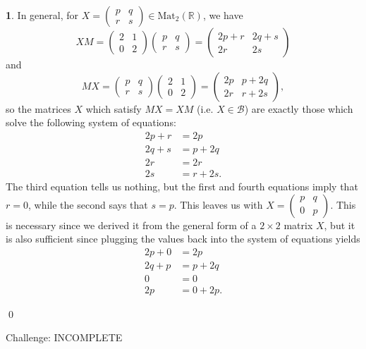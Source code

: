 \documentclass[12pt]{article}
\theoremstyle{definition}
\newtheorem{ex}{}
\begin{document}
\begin{ex}
	In general, for $X = \begin{pmatrix}p & q \\ r & s\end{pmatrix} \in \mathrm{Mat}_2(\mathbb{R})$, we have \begin{equation*}
		XM = \begin{pmatrix}
			2 & 1 \\ 0 & 2
		\end{pmatrix}\begin{pmatrix}
			p & q \\ r & s
		\end{pmatrix} = \begin{pmatrix}
			2p + r & 2q + s \\ 2r & 2s
		\end{pmatrix}
	\end{equation*}
	and \begin{equation*}
		MX = \begin{pmatrix}
			p & q \\ r & s
		\end{pmatrix}\begin{pmatrix}
			2 & 1 \\ 0 & 2
		\end{pmatrix} = \begin{pmatrix}
			2p & p + 2q \\ 2r & r + 2s
		\end{pmatrix},
	\end{equation*}
	so the matrices $X$ which satisfy $MX = XM$ (i.e. $X \in \mathcal{B}$) are exactly those which solve the following system of equations: \begin{align*}
		2p + r & = 2p      \\
		2q + s & = p + 2q  \\
		2r     & = 2r      \\
		2s     & = r + 2s.
	\end{align*}
	The third equation tells us nothing, but the first and fourth equations imply that $r = 0$, while the second says that $s = p$.
	This leaves us with $X = \begin{pmatrix}p & q \\ 0 & p\end{pmatrix}$.
	This is necessary since we derived it from the general form of a $2 \times 2$ matrix $X$, but it is also sufficient since plugging the values back into the system of equations yields \begin{align*}
		2p + 0 & = 2p      \\
		2q + p & = p + 2q  \\
		0      & = 0       \\
		2p     & = 0 + 2p.
	\end{align*}

  \qed

	Challenge: INCOMPLETE
\end{ex}
\end{document}
